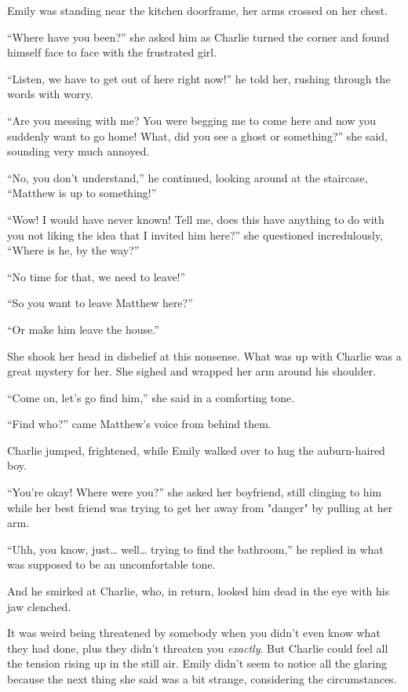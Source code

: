 Emily was standing near the kitchen doorframe, her arms crossed on her chest.

“Where have you been?” she asked him as Charlie turned the corner and found himself face to face with the frustrated girl.

“Listen, we have to get out of here right now!” he told her, rushing through the words with worry.

“Are you messing with me? You were begging me to come here and now you suddenly want to go home! What, did you see a ghost or something?” she said, sounding very much annoyed.

“No, you don't understand,” he continued, looking around at the staircase, “Matthew is up to something!”

“Wow! I would have never known! Tell me, does this have anything to do with you not liking the idea that I invited him here?” she questioned incredulously, “Where is he, by the way?”

“No time for that, we need to leave!”

“So you want to leave Matthew here?”

“Or make him leave the house.”

She shook her head in disbelief at this nonsense. What was up with Charlie was a great mystery for her. She sighed and wrapped her arm around his shoulder.

“Come on, let's go find him,” she said in a comforting tone.

“Find who?” came Matthew's voice from behind them.

Charlie jumped, frightened, while Emily walked over to hug the auburn-haired boy.

“You're okay! Where were you?” she asked her boyfriend, still clinging to him while her best friend was trying to get her away from "danger" by pulling at her arm.

“Uhh, you know, just… well… trying to find the bathroom,” he replied in what was supposed to be an uncomfortable tone.

And he smirked at Charlie, who, in return, looked him dead in the eye with his jaw clenched.

It was weird being threatened by somebody when you didn't even know what they had done, plus they didn't threaten you \textit{exactly}. But Charlie could feel all the tension rising up in the still air. Emily didn't seem to notice all the glaring because the next thing she said was a bit strange, considering the circumstances.

